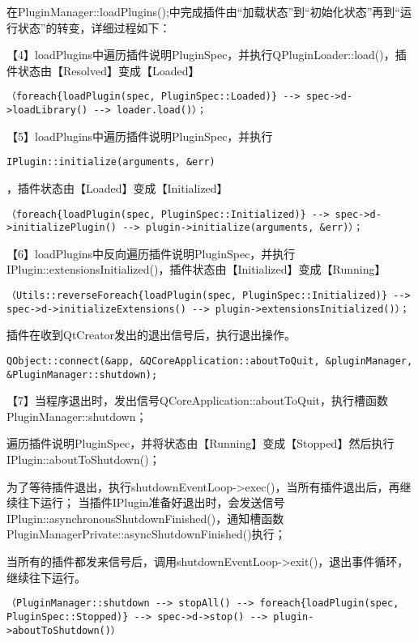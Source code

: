在PluginManager::loadPlugins();中完成插件由“加载状态”到“初始化状态”再到“运行状态”的转变，详细过程如下：

【4】loadPlugins中遍历插件说明PluginSpec，并执行QPluginLoader::load()，插件状态由【Resolved】变成【Loaded】
\begin{lstlisting}
（foreach{loadPlugin(spec, PluginSpec::Loaded)} --> spec->d->loadLibrary() --> loader.load()）；    
\end{lstlisting}


【5】loadPlugins中遍历插件说明PluginSpec，并执行
\begin{lstlisting}
IPlugin::initialize(arguments, &err)    
\end{lstlisting}
，插件状态由【Loaded】变成【Initialized】
\begin{lstlisting}
（foreach{loadPlugin(spec, PluginSpec::Initialized)} --> spec->d->initializePlugin() --> plugin->initialize(arguments, &err)）；
\end{lstlisting}


【6】loadPlugins中反向遍历插件说明PluginSpec，并执行IPlugin::extensionsInitialized()，插件状态由【Initialized】变成【Running】
\begin{lstlisting}
（Utils::reverseForeach{loadPlugin(spec, PluginSpec::Initialized)} --> spec->d->initializeExtensions() --> plugin->extensionsInitialized()）；    
\end{lstlisting}

插件在收到QtCreator发出的退出信号后，执行退出操作。
\begin{lstlisting}
QObject::connect(&app, &QCoreApplication::aboutToQuit, &pluginManager, &PluginManager::shutdown);
\end{lstlisting}

【7】当程序退出时，发出信号QCoreApplication::aboutToQuit，执行槽函数PluginManager::shutdown；

遍历插件说明PluginSpec，并将状态由【Running】变成【Stopped】然后执行IPlugin::aboutToShutdown()；

为了等待插件退出，执行shutdownEventLoop->exec()，当所有插件退出后，再继续往下运行；
当插件IPlugin准备好退出时，会发送信号IPlugin::asynchronousShutdownFinished()，通知槽函数PluginManagerPrivate::asyncShutdownFinished()执行；

当所有的插件都发来信号后，调用shutdownEventLoop->exit()，退出事件循环，继续往下运行。
\begin{lstlisting}
（PluginManager::shutdown --> stopAll() --> foreach{loadPlugin(spec, PluginSpec::Stopped)} --> spec->d->stop() --> plugin->aboutToShutdown()）    
\end{lstlisting}


